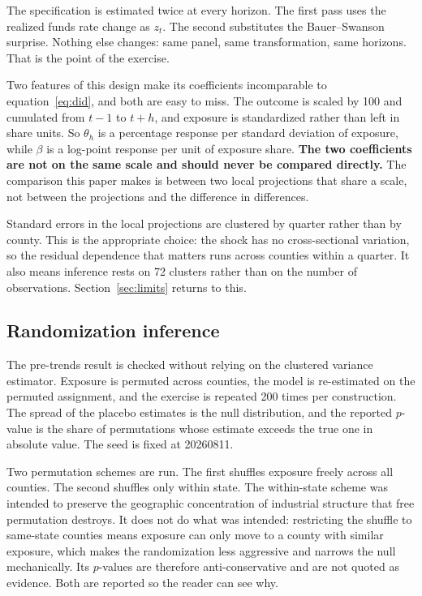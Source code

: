 The specification is estimated twice at every horizon. The first pass uses the
realized funds rate change as $z_t$. The second substitutes the Bauer--Swanson
surprise. Nothing else changes: same panel, same transformation, same horizons.
That is the point of the exercise.

Two features of this design make its coefficients incomparable to
equation~\eqref{eq:did}, and both are easy to miss. The outcome is scaled by
100 and cumulated from $t-1$ to $t+h$, and exposure is standardized rather than
left in share units. So $\theta_h$ is a percentage response per standard
deviation of exposure, while $\beta$ is a log-point response per unit of
exposure share. \textbf{The two coefficients are not on the same scale and
should never be compared directly.} The comparison this paper makes is between
two local projections that share a scale, not between the projections and the
difference in differences.

Standard errors in the local projections are clustered by quarter rather than
by county. This is the appropriate choice: the shock has no cross-sectional
variation, so the residual dependence that matters runs across counties within
a quarter. It also means inference rests on 72 clusters rather than on the
number of observations. Section~\ref{sec:limits} returns to this.

\subsection{Randomization inference}

The pre-trends result is checked without relying on the clustered variance
estimator. Exposure is permuted across counties, the model is re-estimated on
the permuted assignment, and the exercise is repeated 200 times per
construction. The spread of the placebo estimates is the null distribution, and
the reported $p$-value is the share of permutations whose estimate exceeds the
true one in absolute value. The seed is fixed at 20260811.

Two permutation schemes are run. The first shuffles exposure freely across all
counties. The second shuffles only within state. The within-state scheme was
intended to preserve the geographic concentration of industrial structure that
free permutation destroys. It does not do what was intended: restricting the
shuffle to same-state counties means exposure can only move to a county with
similar exposure, which makes the randomization less aggressive and narrows the
null mechanically. Its $p$-values are therefore anti-conservative and are not
quoted as evidence. Both are reported so the reader can see why.

